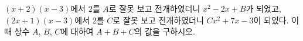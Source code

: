 $(x+2)(x-3)$에서 $2$를 $A$로 잘못 보고 전개하였더니 $x^2-2x+B$가 되었고, $(2x+1)(x-3)$에서 $2$를 $C$로 잘못 보고 전개하였더니 $Cx^2+7x-3$이 되었다. 이때 상수 $A$, $B$, $C$에 대하여 $A+B+C$의 값을 구하시오.
